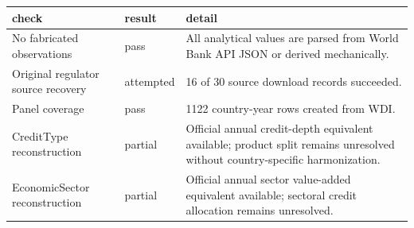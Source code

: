 ﻿%
\begin{tabular}{lll}
\hline
check & result & detail \\
\hline
No fabricated observations & pass & All analytical values are parsed from World Bank API JSON or derived mechanically. \\
Original regulator source recovery & attempted & 16 of 30 source download records succeeded. \\
Panel coverage & pass & 1122 country-year rows created from WDI. \\
CreditType reconstruction & partial & Official annual credit-depth equivalent available; product split remains unresolved without country-specific harmonization. \\
EconomicSector reconstruction & partial & Official annual sector value-added equivalent available; sectoral credit allocation remains unresolved. \\
\hline
\end{tabular}

